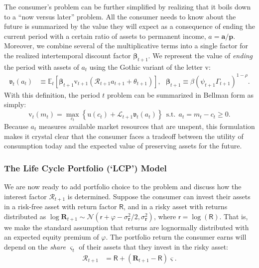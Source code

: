 \documentclass[12pt,letterpaper, fleqn]{article}
\newcommand{\CRRA}{\rho}
\newcommand{\uFunc}{\mathrm{u}}
\newcommand{\aLvl}{\mathbf{a}}
\newcommand{\Rport}{\mathcal{R}}
\newcommand{\pLvl}{\mathbf{p}}
\newcommand{\DiscFac}{\beta}
\newcommand{\vFunc}{\mathrm{v}}
\newcommand{\Alive}{\mathcal{L}}
\newcommand{\Ex}{\mathbb{E}}
\newcommand{\permGroFac}{\Gamma}
\newcommand{\permShk}{\psi}
\newcommand{\tranShk}{\theta}
\newcommand{\cNrm}{c}
\newcommand{\mNrm}{m}
\newcommand{\aNrm}{a}
\newcommand{\Rfree}{\mathsf{R}}
\newcommand{\rfree}{\mathsf{r}}
\newcommand{\eprem}{\varphi}
\newcommand{\Risky}{\mathbf{R}}
\newcommand{\risky}{\mathbf{r}}
\begin{document}
The consumer's problem can be further simplified by realizing that it boils down to a ``now versus later'' problem.
All the consumer needs to know about the future is summarized by the value they will expect as a consequence of ending the current period with a certain ratio of assets to permanent income, $\aNrm = \aLvl/\pLvl$.
Moreover, we combine several of the multiplicative terms into a single factor for the realized intertemporal discount factor $\pmb{\DiscFac}_{t+1}$.
We represent the value of \textit{ending} the period with assets of $\aNrm_t$ using the Gothic variant of the letter $\vFunc$:
\begin{align}
    \mathfrak{v}_{t}(\aNrm_{t}) & \equiv \Ex_{t}[\pmb{\DiscFac}_{t+1}\vFunc_{t+1}(\Rport_{t+1} \aNrm_{t+1} + \tranShk_{t+1})], ~~~ \pmb{\DiscFac}_{t+1} \equiv {\beta} (\permShk_{t+1} \permGroFac_{t+1})^{1-\CRRA}.
\end{align}
With this definition, the period $t$ problem can be summarized in Bellman form as simply:
\begin{equation}
\vFunc_t(\mNrm_t) = \max_{\cNrm_t} \left\{ \uFunc(\cNrm_{t}) + \Alive_{t+1} \mathfrak{v}_{t}(\aNrm_{t}) \right\} ~~\text{s.t.} ~~ a_t = m_t - c_t \geq 0.
\end{equation}
Because $\aNrm_t$ measures available market resources that are unspent, this formulation makes it crystal clear that the consumer faces a tradeoff between the utility of consumption today and the expected value of preserving assets for the future.

\subsubsection{The Life Cycle Portfolio (`LCP') Model}\label{lcp-model}

We are now ready to add portfolio choice to the problem and discuss how the interest factor $\Rport_{t+1}$ is determined.
Suppose the consumer can invest their assets in a risk-free asset with return factor $\Rfree$, and in a risky asset with returns distributed as $\log \Risky_{t+1} \sim \mathcal{N}(\rfree + \eprem - \sigma^{2}_{\risky}/2, \sigma_{\risky}^{2})$, where $\rfree = \log(\Rfree)$.
That is, we make the standard assumption that returns are lognormally distributed with an expected equity premium of $\eprem$.
The portfolio return the consumer earns will depend on the \textit{share} $\varsigma_t$ of their assets that they invest in the risky asset:
\begin{align}
    \Rport_{t+1} & = \Rfree + (\Risky_{t+1}-\Rfree)\varsigma.
\end{align}
\end{document}
